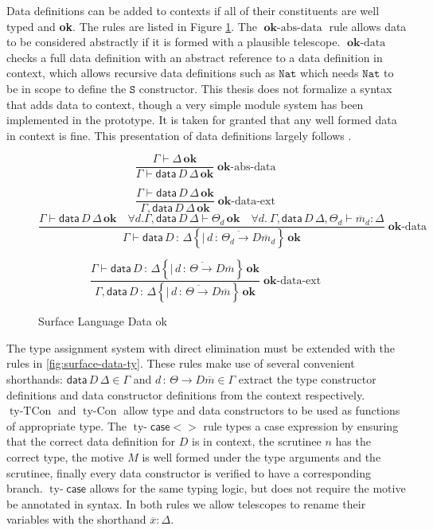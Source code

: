Data definitions can be added to contexts if all of their constituents are well typed and \textbf{ok}.
The rules are listed in Figure \ref{fig:surface-data-ok}.
The $\operatorname{\mathbf{ok}-abs-data}$ rule allows data to be considered abstractly if it is formed with a plausible telescope.
$\operatorname{\mathbf{ok}-data}$ checks a full data definition with an abstract reference to a data definition in context, which allows recursive data definitions such as $\mathtt{Nat}$ which needs $\mathtt{Nat}$ to be in scope to define the $\mathtt{S}$ constructor.
This thesis does not formalize a syntax that adds data to context, though a very simple module system has been implemented in the prototype.
It is taken for granted that any well formed data in context is fine.
This presentation of data definitions largely follows \cite{sjoberg2012irrelevance}. 

\begin{figure}
\[
\frac{\Gamma\vdash\Delta\,\mathbf{ok}}{\Gamma\vdash\mathsf{data}\,D\,\Delta\,\mathbf{ok}}\operatorname{\mathbf{ok}-abs-data}
\]

\[
\frac{\Gamma\vdash\mathsf{data}\,D\,\Delta\,\mathbf{ok}}{\Gamma,\mathsf{data}\,D\,\Delta\,\mathbf{ok}}\operatorname{\mathbf{ok}-data-ext}
\]
\[
\frac{\Gamma\vdash\mathsf{data}\,D\,\Delta\,\mathbf{ok}\quad\forall d.\Gamma,\mathsf{data}\,D\,\Delta\vdash\varTheta_{d}\,\mathbf{ok}\quad\forall d.\:\Gamma,\mathsf{data}\,D\,\Delta,\varTheta_{d}\vdash\overline{m}_{d}:\Delta}{\Gamma\vdash\mathsf{data}\,D\,:\,\Delta\left\{ \overline{|\,d\,:\,\varTheta_{d}\rightarrow D\overline{m}_{d}}\right\} \,\mathbf{ok}}\operatorname{\mathbf{ok}-data}
\]

\[
\frac{\Gamma\vdash\mathsf{data}\,D\,:\,\Delta\left\{ \overline{|\,d\,:\,\varTheta\rightarrow D\overline{m}}\right\} \,\mathbf{ok}}{\Gamma,\mathsf{data}\,D\,:\,\Delta\left\{ \overline{|\,d\,:\,\varTheta\rightarrow D\overline{m}}\right\} \,\mathbf{ok}}\operatorname{\mathbf{ok}-data-ext}
\]

\caption{Surface Language Data ok}
\label{fig:surface-data-ok}
\end{figure}

The type assignment system with direct elimination must be extended with the rules in \ref{fig:surface-data-ty}.
These rules make use of several convenient shorthands: $\mathsf{data}\,D\,\Delta\in\Gamma$ and $d\,:\,\varTheta\rightarrow D\overline{m}\in\Gamma$ extract the type constructor definitions and data constructor definitions from the context respectively.
$\operatorname{ty-TCon}$ and $\operatorname{ty-Con}$ allow type and data constructors to be used as functions of appropriate type.
The $\operatorname{ty-}\mathsf{case}<>$ rule types a case expression by ensuring that the correct data definition for $D$ is in context, the scrutinee $n$ has the correct type, the motive $M$ is well formed under the type arguments and the scrutinee, %
  finally every data constructor is verified to have a corresponding branch.
$\operatorname{ty-}\mathsf{case}$ allows for the same typing logic, but does not require the motive be annotated in syntax.
In both rules we allow telescopes to rename their variables with the shorthand $\overline{x}:\Delta$.

